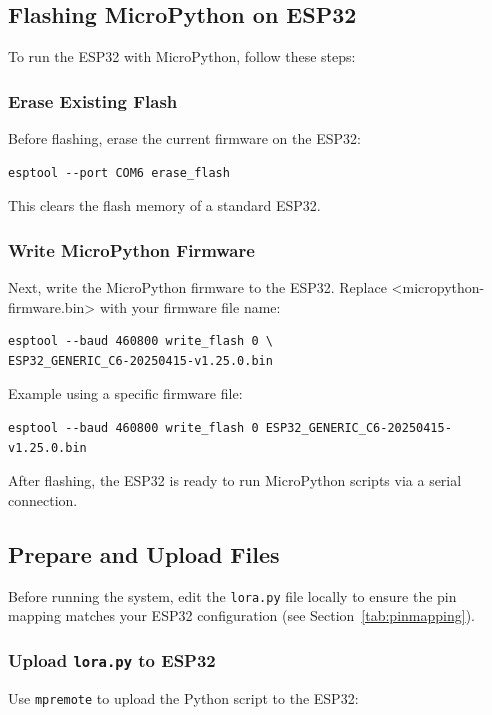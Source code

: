 \subsection{Flashing MicroPython on ESP32}

To run the ESP32 with MicroPython, follow these steps:

\subsubsection{Erase Existing Flash}
Before flashing, erase the current firmware on the ESP32:

\begin{verbatim}
esptool --port COM6 erase_flash
\end{verbatim}

\noindent This clears the flash memory of a standard ESP32.

\subsubsection{Write MicroPython Firmware}
Next, write the MicroPython firmware to the ESP32. Replace {<micropython-firmware.bin>} with your firmware file name:

\begin{verbatim}
esptool --baud 460800 write_flash 0 \
ESP32_GENERIC_C6-20250415-v1.25.0.bin
\end{verbatim}


\noindent Example using a specific firmware file:

\begin{verbatim}
esptool --baud 460800 write_flash 0 ESP32_GENERIC_C6-20250415-v1.25.0.bin
\end{verbatim}

\noindent After flashing, the ESP32 is ready to run MicroPython scripts via a serial connection.

\subsection{Prepare and Upload Files}

Before running the system, edit the \texttt{lora.py} file locally to ensure the pin mapping matches your ESP32 configuration (see Section~\ref{tab:pinmapping}).

\subsubsection{Upload \texttt{lora.py} to ESP32}
Use \texttt{mpremote} to upload the Python script to the ESP32:

